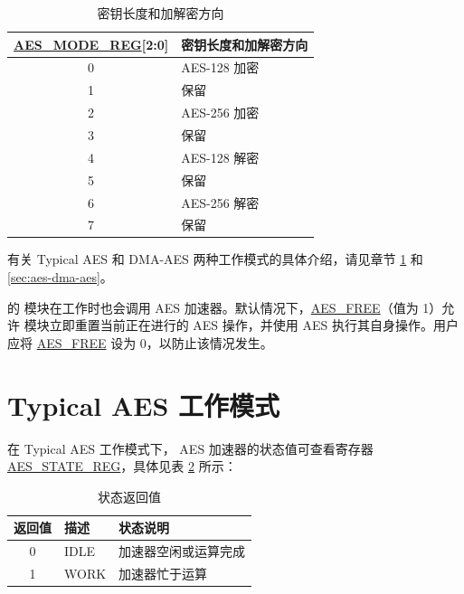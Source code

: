\documentclass[main\_\_CN.tex]{subfiles}
\begin{document}
\begin{longtable}[c]{ | c | l | }
\caption{密钥长度和加解密方向}
\label{tab:aes-operation}
\\\hline
\rowcolor{lightgray}
\textbf{\hyperref[regdesc:AESMODEREG]{AES\_MODE\_REG}[2:0]}     & \textbf{密钥长度和加解密方向}\\
    \hline
    0                   & AES-128 加密    \\
    \hline
    1                   & 保留    \\
    \hline
    2                   & AES-256 加密    \\
    \hline
    3                   & 保留    \\
    \hline
    4                   & AES-128 解密    \\
    \hline
    5                   & 保留    \\
    \hline
    6                   & AES-256 解密    \\
    \hline
    7                   & 保留    \\
    \hline
\end{longtable}

有关 Typical AES 和 DMA-AES 两种工作模式的具体介绍，请见章节 \ref{sec:aes-typical-modes} 和 \ref{sec:aes-dma-aes}。

\begin{importantlisting}
\vspace{-0.5em}

    \chipname{} 的  模块在工作时也会调用 AES 加速器。默认情况下，\hyperref[fielddesc:AESFREE]{AES\_FREE}（值为 1）允许  模块立即重置当前正在进行的 AES 操作，并使用 AES 执行其自身操作。用户应将 \hyperref[fielddesc:AESFREE]{AES\_FREE} 设为 0，以防止该情况发生。

\end{importantlisting}

\section{Typical AES 工作模式}\label{sec:aes-typical-modes}

在 Typical AES 工作模式下，
AES 加速器的状态值可查看寄存器 \hyperref[regdesc:AESSTATEREG]{AES\_STATE\_REG}，具体见表 \ref{tab:aes-state-value-typical} 所示：

\begin{longtable}[c]{ |c | l | l | }
\caption{状态返回值}
\label{tab:aes-state-value-typical}
\\\hline
\rowcolor{lightgray}
\textbf{返回值} & \textbf{描述} &  \textbf{状态说明} \\ \hline

    0                   & IDLE      &   加速器空闲或运算完成\\ \hline
    1                   & WORK      &   加速器忙于运算     \\ \hline
\end{longtable}
\end{document}
